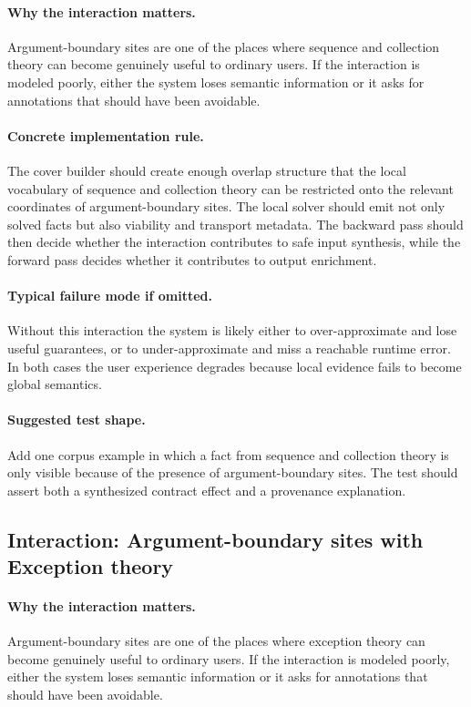 \documentclass[11pt]{report}
\theoremstyle{definition}
\theoremstyle{plain}
\begin{document}
\paragraph{Why the interaction matters.}
Argument-boundary sites are one of the places where sequence and collection theory can become
genuinely useful to ordinary users. If the interaction is modeled poorly,
either the system loses semantic information or it asks for annotations that
should have been avoidable.

\paragraph{Concrete implementation rule.}
The cover builder should create enough overlap structure that the local
vocabulary of sequence and collection theory can be restricted onto the relevant
coordinates of argument-boundary sites. The local solver should emit not only
solved facts but also viability and transport metadata. The backward pass
should then decide whether the interaction contributes to safe input
synthesis, while the forward pass decides whether it contributes to output
enrichment.

\paragraph{Typical failure mode if omitted.}
Without this interaction the system is likely either to over-approximate and
lose useful guarantees, or to under-approximate and miss a reachable runtime
error. In both cases the user experience degrades because local evidence
fails to become global semantics.

\paragraph{Suggested test shape.}
Add one corpus example in which a fact from sequence and collection theory is only
visible because of the presence of argument-boundary sites. The test should
assert both a synthesized contract effect and a provenance explanation.

\subsection{Interaction: Argument-boundary sites with Exception theory}

\paragraph{Why the interaction matters.}
Argument-boundary sites are one of the places where exception theory can become
genuinely useful to ordinary users. If the interaction is modeled poorly,
either the system loses semantic information or it asks for annotations that
should have been avoidable.
\end{document}
